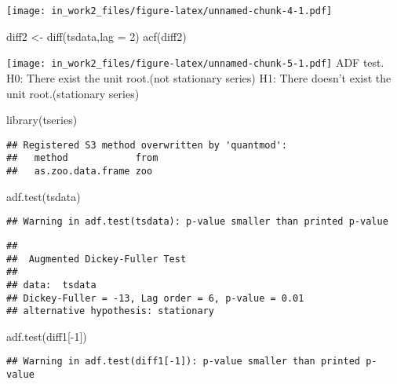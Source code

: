 \documentclass[
]{article}
\newenvironment{Shaded}{\begin{snugshade}}{\end{snugshade}}
\newcommand{\AttributeTok}[1]{\textcolor[rgb]{0.77,0.63,0.00}{#1}}
\newcommand{\DecValTok}[1]{\textcolor[rgb]{0.00,0.00,0.81}{#1}}
\newcommand{\FunctionTok}[1]{\textcolor[rgb]{0.00,0.00,0.00}{#1}}
\newcommand{\NormalTok}[1]{#1}
\newcommand{\OtherTok}[1]{\textcolor[rgb]{0.56,0.35,0.01}{#1}}
\newcommand{\SpecialCharTok}[1]{\textcolor[rgb]{0.00,0.00,0.00}{#1}}
\begin{document}
\texttt{[image: in\_work2\_files/figure-latex/unnamed-chunk-4-1.pdf]}

\begin{Shaded}
\begin{Highlighting}[]
\NormalTok{diff2 }\OtherTok{\textless{}{-}} \FunctionTok{diff}\NormalTok{(tsdata,}\AttributeTok{lag =} \DecValTok{2}\NormalTok{)}
\FunctionTok{acf}\NormalTok{(diff2)}
\end{Highlighting}
\end{Shaded}

\texttt{[image: in\_work2\_files/figure-latex/unnamed-chunk-5-1.pdf]} ADF
test. H0: There exist the unit root.(not stationary series) H1: There
doesn't exist the unit root.(stationary series)

\begin{Shaded}
\begin{Highlighting}[]
\FunctionTok{library}\NormalTok{(tseries)}
\end{Highlighting}
\end{Shaded}

\begin{verbatim}
## Registered S3 method overwritten by 'quantmod':
##   method            from
##   as.zoo.data.frame zoo
\end{verbatim}

\begin{Shaded}
\begin{Highlighting}[]
\FunctionTok{adf.test}\NormalTok{(tsdata)}
\end{Highlighting}
\end{Shaded}

\begin{verbatim}
## Warning in adf.test(tsdata): p-value smaller than printed p-value
\end{verbatim}

\begin{verbatim}
## 
##  Augmented Dickey-Fuller Test
## 
## data:  tsdata
## Dickey-Fuller = -13, Lag order = 6, p-value = 0.01
## alternative hypothesis: stationary
\end{verbatim}

\begin{Shaded}
\begin{Highlighting}[]
\FunctionTok{adf.test}\NormalTok{(diff1[}\SpecialCharTok{{-}}\DecValTok{1}\NormalTok{])}
\end{Highlighting}
\end{Shaded}

\begin{verbatim}
## Warning in adf.test(diff1[-1]): p-value smaller than printed p-value
\end{verbatim}
\end{document}

